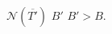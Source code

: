 \documentclass[preview]{standalone}
\begin{document}
$\mathcal{N}\left(\overline{T'}\right)$  $B'$  $B'>B$.\\
\end{document}
